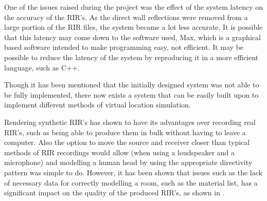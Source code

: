 \documentclass[../../main.tex]{subfiles}
\begin{document}
			 One of the issues raised during the project was the effect of the system latency on the accuracy of the \ac{RIR}'s. As the direct wall reflections were removed from a large portion of the \ac{RIR} files, the system became a lot less accurate. It is possible that this latency may come down to the software used, Max, which is a graphical based software intended to make programming easy, not efficient. It may be possible to reduce the latency of the system by reproducing it in a more efficient language, such as C++.

			Though it has been mentioned that the initially designed system was not able to be fully implemented, there now exists a system that can be easily built upon to implement different methods of virtual location simulation.

			Rendering synthetic \ac{RIR}'s has shown to have its advantages over recording real \ac{RIR}'s, such as being able to produce them in bulk without having to leave a computer. Also the option to move the source and receiver closer than typical methods of \ac{RIR} recordings would allow (when using a loudspeaker and a microphone) and modelling a human head by using the appropriate directivity pattern was simple to do. However, it has been shown that issues such as the lack of necessary data for correctly modelling a room, such as the material list, has a significant impact on the quality of the produced \ac{RIR}'s, as shown in .

\end{document}
